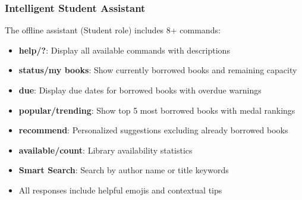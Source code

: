\documentclass[11pt,a4paper]{article}
\begin{document}
\subsubsection{Intelligent Student Assistant}
The offline assistant (Student role) includes 8+ commands:
\begin{itemize}
  \item \textbf{help/?}: Display all available commands with descriptions
  \item \textbf{status/my books}: Show currently borrowed books and remaining capacity
  \item \textbf{due}: Display due dates for borrowed books with overdue warnings
  \item \textbf{popular/trending}: Show top 5 most borrowed books with medal rankings
  \item \textbf{recommend}: Personalized suggestions excluding already borrowed books
  \item \textbf{available/count}: Library availability statistics
  \item \textbf{Smart Search}: Search by author name or title keywords
  \item All responses include helpful emojis and contextual tips
\end{itemize}
\end{document}
